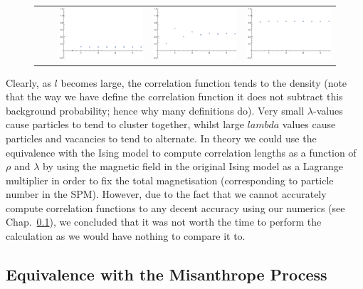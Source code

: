 \begin{figure}[h!]
\begin{center}
\begin{tabular}{c  c | c | c | c}
    \hline
    \raisebox{3 em}{ $10$ } & &    \includegraphics[width=0.32\linewidth]{analytics/images/exactCorrFns/lowDensHighL}  & \includegraphics[width=0.32 \linewidth]{analytics/images/exactCorrFns/midDensHighL} & \includegraphics[width=0.32 \linewidth]{analytics/images/exactCorrFns/highDensHighL} \\
    \end{tabular}
\end{center}
    \vspace{-2em}
\end{figure}

Clearly, as $l$ becomes large, the correlation function tends to the density (note that the way we have define the correlation function it does not subtract this background probability; hence why many definitions do). Very small $\lambda$-values
cause particles to tend to cluster together, whilst large $lambda$ values cause particles and vacancies to tend to alternate. In theory we could use the equivalence with the Ising model to compute correlation lengths as a function
of $\rho$ and $\lambda$ by using the magnetic field in the original Ising model as a Lagrange multiplier in order to fix the total magnetisation (corresponding to particle number in the SPM). However, due to the fact that we cannot
accurately compute correlation functions to any decent accuracy using our numerics (see Chap.~\ref{}), we concluded that it was not worth the time to perform the calculation as we would have nothing to compare it to.

\subsection{Equivalence with the Misanthrope Process}


